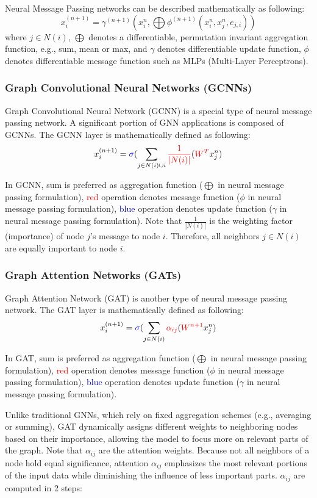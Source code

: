 Neural Message Passing networks can be described mathematically as following: $$x_i^{(n+1)} = \gamma^{(n+1)}(x_i^n, \bigoplus \phi^{(n+1)}(x_i^n, x_j^n, e_{j,i}))$$
where $j \in N(i)$, $\bigoplus$ denotes a differentiable, permutation invariant aggregation function, e.g., sum, mean or max, and $\gamma$ denotes differentiable update function, $\phi$ denotes differentiable message function such as MLPs (Multi-Layer Perceptrons).


\subsubsection{Graph Convolutional Neural Networks (GCNNs)}\label{subsec:graph-convolutional-neural-networks-(gcnns)}
Graph Convolutional Neural Network (GCNN) is a special type of neural message passing network.
A significant portion of GNN applications is composed of GCNNs. The GCNN layer is mathematically defined as following: $$x_i^{(n+1)} = \textcolor{blue}{\sigma}(\sum_{j \in N(i) \cup {i}} \textcolor{red}{\frac{1}{|N(i)|}}(\textcolor{red}{W^T}x_j^n)$$


In GCNN, sum is preferred as aggregation function ($\bigoplus$ in neural message passing formulation), \textcolor{red}{red} operation denotes message function ($\phi$ in neural message passing formulation), \textcolor{blue}{blue} operation denotes update function ($\gamma$ in neural message passing formulation).
Note that $\frac{1}{|N(i)|}$ is the weighting factor (importance) of node $j$’s message to node $i$.
Therefore, all neighbors $j \in N(i)$ are equally important to node $i$.


\subsubsection{Graph Attention Networks (GATs)}\label{subsec:graph-attention-networks-(gats)}
Graph Attention Network (GAT) is another type of neural message passing network. The GAT layer is mathematically defined as following: $$x_i^{(n+1)} = \textcolor{blue}{\sigma}(\sum_{j \in N(i)} \textcolor{red}{\alpha_{ij}}(\textcolor{red}{W^{n+1}}x_j^n)$$


In GAT, sum is preferred as aggregation function ($\bigoplus$ in neural message passing formulation), \textcolor{red}{red} operation denotes message function ($\phi$  in neural message passing formulation), \textcolor{blue}{blue} operation denotes update function ($\gamma$ in neural message passing formulation).

Unlike traditional GNNs, which rely on fixed aggregation schemes (e.g., averaging or summing), GAT dynamically assigns different weights to neighboring nodes based on their importance, allowing the model to focus more on relevant parts of the graph.
Note that $\alpha_{ij}$ are the attention weights.
Because not all neighbors of a node hold equal significance, attention $\alpha_{ij}$ emphasizes the most relevant portions of the input data while diminishing the influence of less important parts. $\alpha_{ij}$ are computed in 2 steps:


